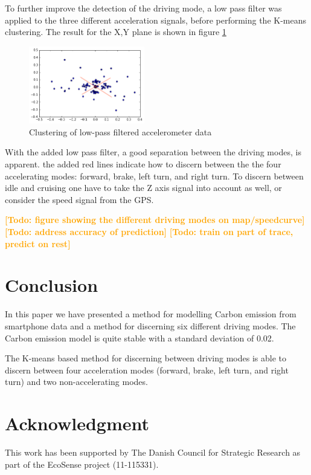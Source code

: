 \documentclass[conference]{IEEEtran}
\newcommand{\todo}[1]{\textsf{\textbf{\textcolor{Orange}{[Todo: #1]}}}}
\newcommand{\todo}[1]{}
\begin{document}
To further improve the detection of the driving mode, a low pass filter was applied to the three different acceleration signals, before performing the K-means clustering. The result for the X,Y plane is shown in figure \ref{cluster2}
\begin{figure}[h]
	\centering
	\includegraphics[width=0.45\textwidth]{cluster_acc2}
  \caption{Clustering of low-pass filtered accelerometer data}
  \label{cluster2}
\end{figure}

With the added low pass filter, a good separation between the driving modes, is apparent. the added red lines indicate how to discern between the the four accelerating modes: forward, brake, left turn, and right turn. To discern between idle and cruising one have to take the Z axis signal into account as well, or consider the speed signal from the GPS.  

\todo{figure showing the different driving modes on map/speedcurve}
\todo{address accuracy of prediction}
\todo{train on part of trace, predict on rest}%
\section{Conclusion}

In this paper we have presented a method for modelling Carbon emission from smartphone data and a method for discerning six different driving modes. The Carbon emission model is quite stable with a standard deviation of 0.02. 

The K-means based method for discerning between driving modes is able to discern between four acceleration modes (forward, brake, left turn, and right turn) and two non-accelerating modes.\section*{Acknowledgment}
This work has been supported by The Danish Council for Strategic Research as part of the EcoSense project (11-115331).
\newpage
{}	


\end{document}
